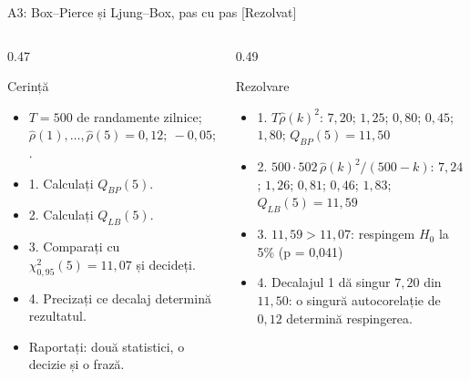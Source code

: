 \begin{frame}{A3: Box--Pierce și Ljung--Box, pas cu pas [Rezolvat]}
\itemsize{\scriptsize}
\begin{columns}[T]
\begin{column}{0.47\textwidth}
\begin{block}{Cerință}
\begin{itemize}
    \item $T = 500$ de randamente zilnice; $\hat\rho(1), \dots, \hat\rho(5) = 0{,}12;\ -0{,}05;\ 0{,}04;\ 0{,}03;\ -0{,}06$.
    \item 1. Calculați $Q_{BP}(5)$.
    \item 2. Calculați $Q_{LB}(5)$.
    \item 3. Comparați cu $\chi^2_{0{,}95}(5) = 11{,}07$ și decideți.
    \item 4. Precizați ce decalaj determină rezultatul.
    \item Raportați: două statistici, o decizie și o frază.
\end{itemize}
\end{block}
\end{column}
\begin{column}{0.49\textwidth}
\begin{exampleblock}{Rezolvare}
\begin{itemize}
    \item 1. $T\hat\rho(k)^2$: $7{,}20$; $1{,}25$; $0{,}80$; $0{,}45$; $1{,}80$; $Q_{BP}(5) = 11{,}50$
    \item 2. $500 \cdot 502\,\hat\rho(k)^2/(500 - k)$: $7{,}24$; $1{,}26$; $0{,}81$; $0{,}46$; $1{,}83$; $Q_{LB}(5) = 11{,}59$
    \item 3. $11{,}59 > 11{,}07$: respingem $H_0$ la 5\% (p = 0{,}041)
    \item 4. Decalajul 1 dă singur $7{,}20$ din $11{,}50$: o singură autocorelație de $0{,}12$ determină respingerea.
\end{itemize}
\end{exampleblock}
\end{column}
\end{columns}
\end{frame}


